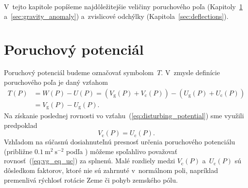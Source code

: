 \documentclass[a4paper,12pt]{book}
\newcommand{\gidx}{\mathrm g}
\newcommand{\cidx}{\mathrm c}
\begin{document}
V~tejto kapitole popíšeme najdôležitejšie veličiny poruchového poľa 
(Kapitoly~\ref{sec:disturbing_potential} a~\ref{sec:gravity_anomaly}) 
a~zvislicové odchýlky (Kapitola~\ref{sec:deflections}).






\section{Poruchový potenciál}
\label{sec:disturbing_potential}

Poruchový potenciál budeme označovať symbolom~$T$.  V~zmysle definície 
poruchového poľa je daný vzťahom
%
\begin{equation}
\label{eq:disturbing_potential}
\begin{split}
T(P) &= W(P) - U(P) = (V_\gidx(P) + V_\cidx(P)) - (U_\gidx(P) + U_\cidx(P))\\
%
&= V_\gidx(P) - U_\gidx(P){.}
\end{split}
\end{equation}
%
Na získanie poslednej rovnosti vo vzťahu~(\ref{eq:disturbing_potential}) sme 
využili predpoklad
%
\begin{equation}
\label{eq:vg_eq_uc}
V_\cidx(P) = U_\cidx(P){.}
\end{equation}
%
Vzhľadom na súčasnú dosiahnuteľnú presnosť určenia poruchového potenciálu 
(približne $0.1\ \mathrm{m}^2 \ \mathrm{s}^{-2}$ podľa 
\cite{SansoGeoidDetermination}) môžeme spoľahlivo považovať 
rovnosť~(\ref{eq:vg_eq_uc}) za splnenú.  Malé rozdiely medzi $V_\cidx(P)$ 
a~$U_\cidx(P)$ sú dôsledkom faktorov, ktoré nie sú zahrnuté v~normálnom poli, 
napríklad premenlivá rýchlosť rotácie Zeme či pohyb zemského pólu.
\end{document}
